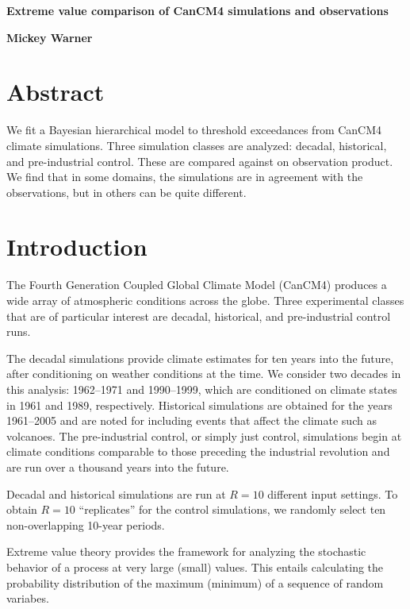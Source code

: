 \documentclass[12pt]{article}
\begin{document}
\begin{Large}
\noindent \textbf{Extreme value comparison of CanCM4 simulations and observations}
\end{Large}
\bigskip

\noindent \textbf{Mickey Warner}


\section{Abstract}
\label{abstract}
We fit a Bayesian hierarchical model to threshold exceedances from CanCM4 climate simulations. Three simulation classes are analyzed: decadal, historical, and pre-industrial control. These are compared against on observation product. We find that in some domains, the simulations are in agreement with the observations, but in others can be quite different.

\section{Introduction}
\label{intro}

The Fourth Generation Coupled Global Climate Model (CanCM4) produces a wide array of atmospheric conditions across the globe. Three experimental classes that are of particular interest are decadal, historical, and pre-industrial control runs.

The decadal simulations provide climate estimates for ten years into the future, after conditioning on weather conditions at the time. We consider two decades in this analysis: 1962--1971 and 1990--1999, which are conditioned on climate states in 1961 and 1989, respectively. Historical simulations are obtained for the years 1961--2005 and are noted for including events that affect the climate such as volcanoes. The pre-industrial control, or simply just control, simulations begin at climate conditions comparable to those preceding the industrial revolution and are run over a thousand years into the future.

Decadal and historical simulations are run at $R=10$ different input settings. To obtain $R=10$ ``replicates'' for the control simulations, we randomly select ten non-overlapping 10-year periods.






Extreme value theory provides the framework for analyzing the stochastic behavior of a process at very large (small) values. This entails calculating the probability distribution of the maximum (minimum) of a sequence of random variabes. 
\end{document}
